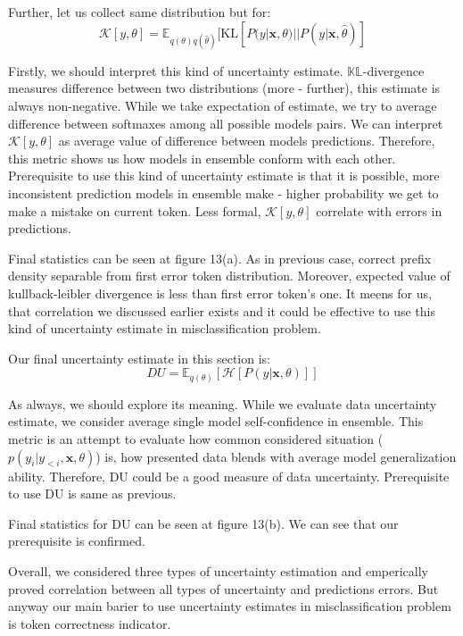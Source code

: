 \documentclass[a4paper,14pt]{extarticle}
\begin{document}
	Further, let us collect same distribution but for:
	\begin{equation*}
		\mathcal{K}[y, \theta] = \mathbb{E}_{q(\theta)q(\hat{\theta})}[
			\mathrm{KL}[P(y|\textbf{x}, \theta) || P(y|\textbf{x}, \hat{\theta})
		]
	\end{equation*}
	
	Firstly, we should interpret this kind of uncertainty estimate. $\mathbb{KL}$-divergence measures difference between two distributions (more - further), this estimate is always non-negative. While we take expectation of estimate, we try to average difference between softmaxes among all possible models pairs. We can interpret $\mathcal{K}[y, \theta]$ as average value of difference between models predictions. Therefore, this metric shows us how models in ensemble conform with each other. Prerequisite to use this kind of uncertainty estimate is that it is possible, more inconsistent prediction models in ensemble make - higher probability we get to make a mistake on current token. Less formal, $\mathcal{K}[y, \theta]$ correlate with errors in predictions.
	
	Final statistics can be seen at figure 13(a). As in previous case, correct prefix density separable from first error token distribution. Moreover, expected value of kullback-leibler divergence is less than first error token's one. It meens for us, that correlation we discussed earlier exists and it could be effective to use this kind of uncertainty estimate in misclassification problem. 
	
	Our final uncertainty estimate in this section is:
	\begin{equation*}
		DU = \mathbb{E}_{q(\theta)}[\mathcal{H}[P(y| \textbf{x}, \theta)]]
	\end{equation*}
	
	As always, we should explore its meaning. While we evaluate data uncertainty estimate, we consider average single model self-confidence in ensemble. This metric is an attempt to evaluate how common considered situation ($p(y_i | y_{<i}, \textbf{x}, \theta)$) is, how presented data blends with average model generalization ability. Therefore, DU could be a good measure of data uncertainty. Prerequisite to use DU is same as previous.
	
	Final statistics for DU can be seen at figure 13(b). We can see that our prerequisite is confirmed.
	
	Overall, we considered three types of uncertainty estimation and emperically proved correlation between all types of uncertainty and predictions errors. But anyway our main barier to use uncertainty estimates in misclassification problem is token correctness indicator.
	
\end{document}
